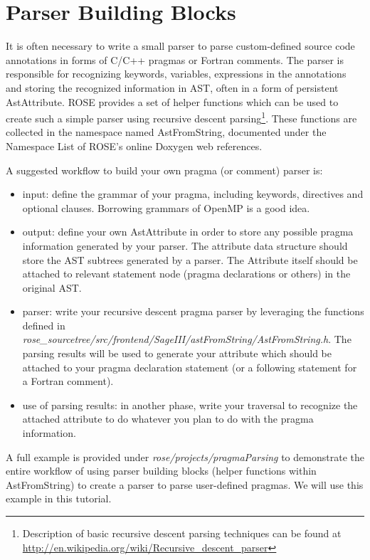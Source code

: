\chapter{Parser Building Blocks}
\label{chap:parserBlocks}
It is often necessary to write a small parser to parse custom-defined source code annotations in forms of C/C++ pragmas or Fortran comments.
The parser is responsible for recognizing keywords, variables, expressions in the annotations and storing the recognized information in AST, often
in a form of persistent AstAttribute.
ROSE provides a set of helper functions which can be used to create such a simple parser using recursive descent parsing\footnote{Description of basic recursive descent parsing techniques can be found at \url{http://en.wikipedia.org/wiki/Recursive_descent_parser}}. These functions are collected in the namespace named AstFromString, documented under the Namespace List of ROSE's online Doxygen web references.  

A suggested workflow to build your own pragma (or comment) parser is:
\begin{itemize}
\item  input: define the grammar of your pragma, including keywords, directives and optional clauses. Borrowing grammars of OpenMP is a good idea.
\item  output: define your own AstAttribute in order to store any possible pragma information generated by your parser. The attribute data structure should store the AST subtrees generated by a parser. The Attribute itself should be attached to relevant statement node (pragma declarations or others) in the original AST.
\item  parser: write your recursive descent pragma parser by leveraging the functions defined in  \textit{rose\_sourcetree/src/frontend/SageIII/astFromString/AstFromString.h}.  The parsing results will be used to generate your attribute which should be attached to your pragma declaration statement (or a following statement for a Fortran comment).
\item use of parsing results: in another phase, write your traversal to recognize the attached attribute to do whatever you plan to do with the pragma information.
\end{itemize}

A full example is provided under \textit{rose/projects/pragmaParsing} to demonstrate the entire workflow of using parser building blocks (helper functions within AstFromString) to create a parser to parse user-defined pragmas.  
We will use this example in this tutorial.


